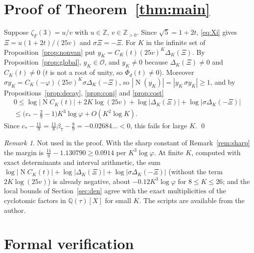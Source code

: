 \documentclass[11pt]{amsart}
\theoremstyle{definition}
\theoremstyle{remark}
\newtheorem{remark}[theorem]{Remark}
\numberwithin{equation}{section}
\newcommand{\ZZ}{\mathbb{Z}}
\newcommand{\QQ}{\mathbb{Q}}
\newcommand{\cO}{\mathcal{O}}
\newcommand{\Nm}{\operatorname{N}}
\begin{document}
\section{\texorpdfstring{Proof of Theorem~\ref{thm:main}}{Proof of the theorem}}\label{sec:proof}

Suppose $\zeta_F(3)=u/v$ with $u\in\ZZ$, $v\in\ZZ_{>0}$. Since $\sqrt5=1+2t$, \eqref{eq:Xi} gives
$\Xi=u(1+2t)/(25v)$ and $\sigma\Xi=-\Xi$. For $K$ in the infinite set of Proposition~\ref{prop:nonvan} put
$y_K=C_K(t)(25v)^K\Delta_K(\Xi)$. By Proposition~\ref{prop:global}, $y_K\in\cO$, and $y_K\ne0$ because
$\Delta_K(\Xi)\ne0$ and $C_K(t)\ne0$ ($t$ is not a root of unity, so $\Phi_d(t)\ne0$). Moreover
$\sigma y_K=C_K(-\varphi)(25v)^K\sigma\Delta_K(-\Xi)$, so $|\Nm(y_K)|=|y_K\,\sigma y_K|\ge1$, and by
Propositions~\ref{prop:decay}, \ref{prop:conj} and \ref{prop:cost}
\begin{multline*}
0\le\log|\Nm C_K(t)|+2K\log(25v)+\log|\Delta_K(\Xi)|+\log|\sigma\Delta_K(-\Xi)|\\
\le\bigl(c_*-\tfrac29-1\bigr)K^3\log\varphi+O(K^2\log K).
\end{multline*}
Since $c_*-\tfrac{11}9=\tfrac{11}8\beta_7-\tfrac89=-0.02684\ldots<0$, this fails for large $K$. \qed

\begin{remark}
Not used in the proof. With the sharp constant of Remark~\ref{rem:sharp} the margin is
$\tfrac{11}9-1.130790\ge0.0914$ per $K^3\log\varphi$. At finite $K$, computed with exact determinants and interval
arithmetic, the sum $\log|\Nm C_K(t)|+\log|\Delta_K(\Xi)|+\log|\sigma\Delta_K(-\Xi)|$ (without the term
$2K\log(25v)$) is already negative, about $-0.12K^3\log\varphi$ for $8\le K\le26$; and the local bounds of
Section~\ref{sec:den} agree with the exact multiplicities of the cyclotomic factors in $\QQ(\tau)[X]$ for small $K$.
The scripts are available from the author.
\end{remark}

\section{Formal verification}\label{sec:lean}
\end{document}

